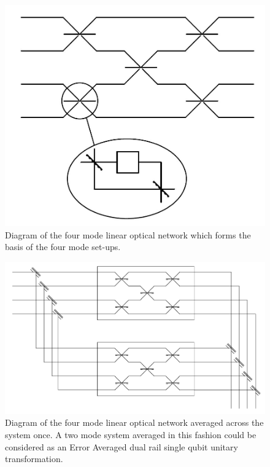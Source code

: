\documentclass[aps,pra,twocolumn,superscriptaddress,numerical]{revtex4-1}
\begin{document}
		\begin{figure}[h]
			\begin{centering}
				\includegraphics[width=\columnwidth]{4_mode_N=2.jpg}
				\par\end{centering}
			
			\caption{Diagram of the four mode linear optical network which forms the basis of the four mode set-ups. \label{fig:4 mode basis diagram}}
		\end{figure}
		
		
		\begin{figure}[h]
			\begin{centering}
				\includegraphics[width=\columnwidth]{4_mode_average_across.jpg}
				\par\end{centering}
			
			\caption{Diagram of the four mode linear optical network averaged across the system once. A two mode system averaged in this fashion could be considered as an Error Averaged dual rail single qubit unitary transformation. \label{fig: averaging 4 mode diagram}}
		\end{figure}
		
\end{document}

